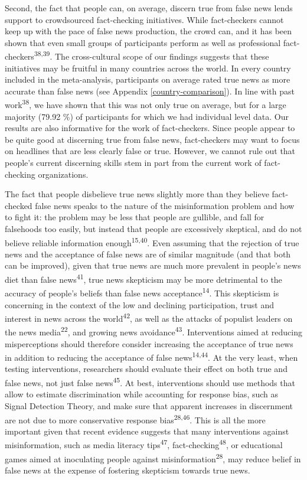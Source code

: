 \documentclass[
  man]{apa6}
\begin{document}
Second, the fact that people can, on average, discern true from false news lends support to crowdsourced fact-checking initiatives. While fact-checkers cannot keep up with the pace of false news production, the crowd can, and it has been shown that even small groups of participants perform as well as professional fact-checkers\textsuperscript{38,39}. The cross-cultural scope of our findings suggests that these initiatives may be fruitful in many countries across the world. In every country included in the meta-analysis, participants on average rated true news as more accurate than false news (see Appendix \ref{country-comparison}). In line with past work\textsuperscript{38}, we have shown that this was not only true on average, but for a large majority (79.92 \%) of participants for which we had individual level data. Our results are also informative for the work of fact-checkers. Since people appear to be quite good at discerning true from false news, fact-checkers may want to focus on headlines that are less clearly false or true. However, we cannot rule out that people's current discerning skills stem in part from the current work of fact-checking organizations.

The fact that people disbelieve true news slightly more than they believe fact-checked false news speaks to the nature of the misinformation problem and how to fight it: the problem may be less that people are gullible, and fall for falsehoods too easily, but instead that people are excessively skeptical, and do not believe reliable information enough\textsuperscript{15,40}. Even assuming that the rejection of true news and the acceptance of false news are of similar magnitude (and that both can be improved), given that true news are much more prevalent in people's news diet than false news\textsuperscript{41}, true news skepticism may be more detrimental to the accuracy of people's beliefs than false news acceptance\textsuperscript{14}. This skepticism is concerning in the context of the low and declining participation, trust and interest in news across the world\textsuperscript{42}, as well as the attacks of populist leaders on the news media\textsuperscript{22}, and growing news avoidance\textsuperscript{43}. Interventions aimed at reducing misperceptions should therefore consider increasing the acceptance of true news in addition to reducing the acceptance of false news\textsuperscript{14,44}. At the very least, when testing interventions, researchers should evaluate their effect on both true and false news, not just false news\textsuperscript{45}. At best, interventions should use methods that allow to estimate discrimination while accounting for response bias, such as Signal Detection Theory, and make sure that apparent increases in discernment are not due to more conservative response bias\textsuperscript{28,46}. This is all the more important given that recent evidence suggests that many interventions against misinformation, such as media literacy tips\textsuperscript{47}, fact-checking\textsuperscript{48}, or educational games aimed at inoculating people against misinformation\textsuperscript{28}, may reduce belief in false news at the expense of fostering skepticism towards true news.
\end{document}
